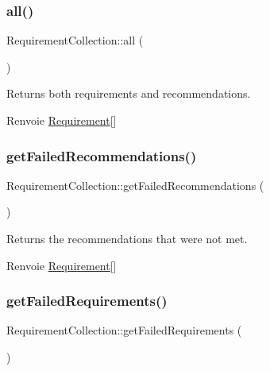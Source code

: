 \subsubsection{\texorpdfstring{all()}{all()}}
{\footnotesize\ttfamily Requirement\+Collection\+::all (\begin{DoxyParamCaption}{ }\end{DoxyParamCaption})}

Returns both requirements and recommendations.

\begin{DoxyReturn}{Renvoie}
\hyperlink{classRequirement}{Requirement}\mbox{[}\mbox{]} 
\end{DoxyReturn}
\mbox{\label{classRequirementCollection_ae11e0e7a5fd890a48f29d35876684e14}} 
\subsubsection{\texorpdfstring{get\+Failed\+Recommendations()}{getFailedRecommendations()}}
{\footnotesize\ttfamily Requirement\+Collection\+::get\+Failed\+Recommendations (\begin{DoxyParamCaption}{ }\end{DoxyParamCaption})}

Returns the recommendations that were not met.

\begin{DoxyReturn}{Renvoie}
\hyperlink{classRequirement}{Requirement}\mbox{[}\mbox{]} 
\end{DoxyReturn}
\mbox{\label{classRequirementCollection_acd45245ad3ababfaeb5f0565add5e7cc}} 
\subsubsection{\texorpdfstring{get\+Failed\+Requirements()}{getFailedRequirements()}}
{\footnotesize\ttfamily Requirement\+Collection\+::get\+Failed\+Requirements (\begin{DoxyParamCaption}{ }\end{DoxyParamCaption})}

